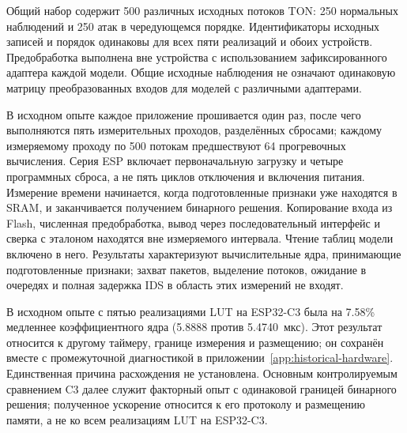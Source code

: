 Общий набор содержит 500 различных исходных потоков TON: 250 нормальных наблюдений и 250 атак в чередующемся порядке. Идентификаторы исходных записей и порядок одинаковы для всех пяти реализаций и обоих устройств. Предобработка выполнена вне устройства с использованием зафиксированного адаптера каждой модели. Общие исходные наблюдения не означают одинаковую матрицу преобразованных входов для моделей с различными адаптерами.

В исходном опыте каждое приложение прошивается один раз, после чего выполняются пять измерительных проходов, разделённых сбросами; каждому измеряемому проходу по 500 потокам предшествуют 64 прогревочных вычисления. Серия ESP включает первоначальную загрузку и четыре программных сброса, а не пять циклов отключения и включения питания. Измерение времени начинается, когда подготовленные признаки уже находятся в SRAM, и заканчивается получением бинарного решения. Копирование входа из Flash, численная предобработка, вывод через последовательный интерфейс и сверка с эталоном находятся вне измеряемого интервала. Чтение таблиц модели включено в него. Результаты характеризуют вычислительные ядра, принимающие подготовленные признаки; захват пакетов, выделение потоков, ожидание в очередях и полная задержка IDS в область этих измерений не входят.



В исходном опыте с пятью реализациями LUT на ESP32-C3 была на 7.58\% медленнее коэффициентного ядра (5.8888 против 5.4740~мкс). Этот результат относится к другому таймеру, границе измерения и размещению; он сохранён вместе с промежуточной диагностикой в приложении~\ref{app:historical-hardware}. Единственная причина расхождения не установлена. Основным контролируемым сравнением C3 далее служит факторный опыт с одинаковой границей бинарного решения; полученное ускорение относится к его протоколу и размещению памяти, а не ко всем реализациям LUT на ESP32-C3.







\FloatBarrier
